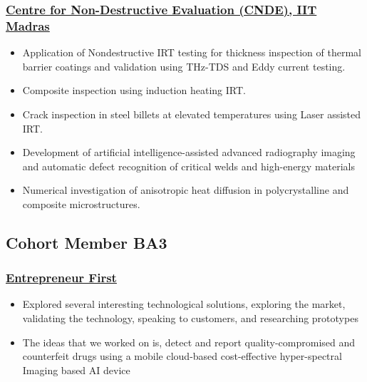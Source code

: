\documentclass{my_cv}%
\begin{document}
\subsubsection{\href{https://www.cnde.in/}{Centre for Non-Destructive Evaluation (CNDE), IIT Madras}}
\begin{itemize}[leftmargin=0.15in]
\setlength\itemsep{-0.1em}
\color{mygray}
\item Application of Nondestructive IRT testing for thickness inspection of thermal barrier coatings and validation using THz-TDS and Eddy current testing.
\item Composite inspection using induction heating IRT.
\item Crack inspection in steel billets at elevated temperatures using Laser assisted IRT.
\item Development of artificial intelligence-assisted advanced radiography imaging and automatic defect recognition of critical welds and high-energy materials
\item Numerical investigation of anisotropic heat diffusion in polycrystalline and composite microstructures.
\end{itemize}%
{\color{mygray1} \hdashrule[0.1ex]{18.8cm}{0.2mm}{1mm}}
\subsection{Cohort Member BA3}
\subsubsection{\href{https://www.joinef.com/}{Entrepreneur First}}
\begin{itemize}[leftmargin=0.15in]
\setlength\itemsep{-0.1em}
\color{mygray}
\item Explored several interesting technological solutions, exploring the market, validating the technology, speaking to customers, and researching prototypes
\item The ideas that we worked on is, detect and report quality-compromised and counterfeit drugs using a mobile cloud-based cost-effective hyper-spectral Imaging based AI device
\end{itemize}
{\color{mygray1} \hdashrule[0.1ex]{18.8cm}{0.2mm}{1mm}}
\end{document}
